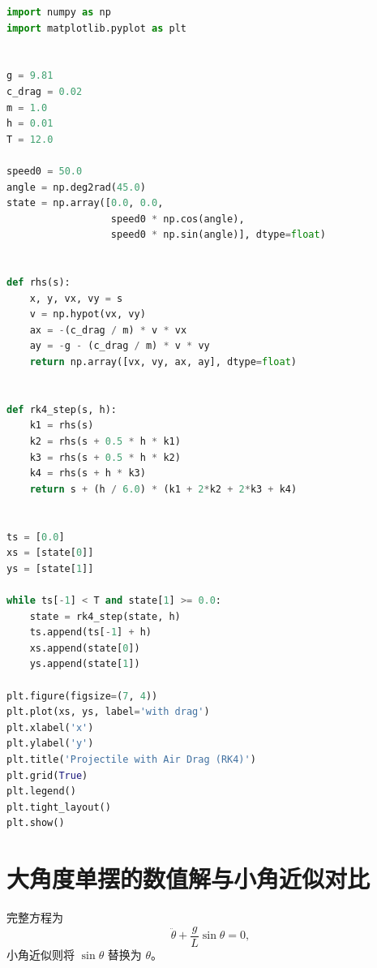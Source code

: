 \begin{lstlisting}[language=Python]
import numpy as np
import matplotlib.pyplot as plt


g = 9.81
c_drag = 0.02
m = 1.0
h = 0.01
T = 12.0

speed0 = 50.0
angle = np.deg2rad(45.0)
state = np.array([0.0, 0.0,
                  speed0 * np.cos(angle),
                  speed0 * np.sin(angle)], dtype=float)


def rhs(s):
    x, y, vx, vy = s
    v = np.hypot(vx, vy)
    ax = -(c_drag / m) * v * vx
    ay = -g - (c_drag / m) * v * vy
    return np.array([vx, vy, ax, ay], dtype=float)


def rk4_step(s, h):
    k1 = rhs(s)
    k2 = rhs(s + 0.5 * h * k1)
    k3 = rhs(s + 0.5 * h * k2)
    k4 = rhs(s + h * k3)
    return s + (h / 6.0) * (k1 + 2*k2 + 2*k3 + k4)


ts = [0.0]
xs = [state[0]]
ys = [state[1]]

while ts[-1] < T and state[1] >= 0.0:
    state = rk4_step(state, h)
    ts.append(ts[-1] + h)
    xs.append(state[0])
    ys.append(state[1])

plt.figure(figsize=(7, 4))
plt.plot(xs, ys, label='with drag')
plt.xlabel('x')
plt.ylabel('y')
plt.title('Projectile with Air Drag (RK4)')
plt.grid(True)
plt.legend()
plt.tight_layout()
plt.show()
\end{lstlisting}

\section{大角度单摆的数值解与小角近似对比}

完整方程为
\[
\ddot \theta+\frac{g}{L}\sin\theta=0,
\]
小角近似则将 $\sin\theta$ 替换为 $\theta$。

